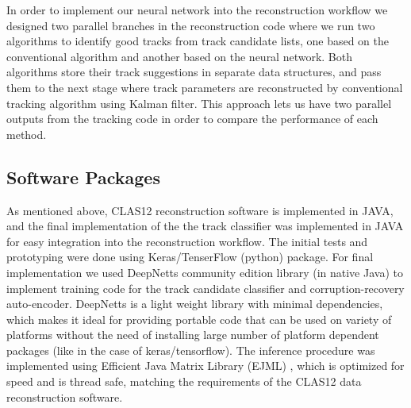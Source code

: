 In order to implement our neural network into the reconstruction workflow we designed two parallel branches in the reconstruction code where we run 
two algorithms to identify good tracks from track candidate lists, one based on the conventional algorithm and another based on the neural network.
Both algorithms store their track suggestions in separate data structures, and pass them to the next stage where track parameters are reconstructed by 
conventional tracking algorithm using Kalman filter. This approach lets us have two parallel outputs from the tracking code in order to compare the performance of
each method.

\subsection{Software Packages}

As mentioned above, CLAS12 reconstruction software is implemented in JAVA, and the final implementation of the the track classifier was implemented in JAVA for easy integration into the reconstruction workflow. The initial tests and prototyping were done using Keras/TenserFlow (python) package. For final implementation we used DeepNetts \cite{Sevarac.Z} community edition library (in native Java) to implement training code for the track candidate classifier and corruption-recovery auto-encoder. DeepNetts is a light weight library with minimal dependencies, which makes it ideal for providing portable code that can be used on variety of platforms without the need of installing large number of platform dependent packages (like in the case of keras/tensorflow).
The inference procedure was implemented using Efficient Java Matrix Library (EJML) \cite{ejml:2021}, which is optimized for speed and is thread safe, matching the requirements of the CLAS12 data reconstruction software.
